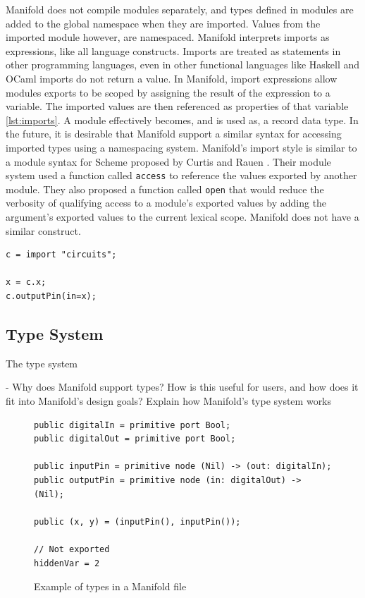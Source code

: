 Manifold does not compile modules separately, and types defined in modules are
added to the global namespace when they are imported. Values from the imported
module however, are namespaced. Manifold interprets imports as expressions,
like all language constructs. Imports are treated as statements in other
programming languages, even in other functional languages like Haskell and
OCaml imports do not return a value.  In Manifold, import expressions allow modules
exports to be scoped by assigning the result of the expression
to a variable. The imported values are then referenced as properties of that
variable \ref{lst:imports}. A module effectively becomes, and is used as, a
record data type. In the future, it is desirable that Manifold support a
similar syntax for accessing imported types using a namespacing system.
Manifold's import style is similar to a module syntax for Scheme proposed by
Curtis and Rauen \cite{Curtis:1990:MSS:91556.91573}. Their module system used
a function called \texttt{access} to reference the values exported by another
module. They also proposed a function called \texttt{open} that would reduce
the verbosity of qualifying access to a module's exported values by adding the
argument's exported values to the current lexical scope. Manifold does not
have a similar construct.

\begin{lstlisting}[label=lst:imports, caption=A module imported into a Manifold file]
c = import "circuits";

x = c.x;
c.outputPin(in=x);
\end{lstlisting}

\subsection{Type System}

The type system

- Why does Manifold support types? How is this useful for users, and how does it fit into Manifold's design goals?
Explain how Manifold's type system works

\begin{figure}[!ht]
\label{fig:exports}
\caption{Example of types in a Manifold file}
\begin{lstlisting}
public digitalIn = primitive port Bool;
public digitalOut = primitive port Bool;

public inputPin = primitive node (Nil) -> (out: digitalIn);
public outputPin = primitive node (in: digitalOut) -> (Nil);

public (x, y) = (inputPin(), inputPin());

// Not exported
hiddenVar = 2
\end{lstlisting}
\end{figure}

